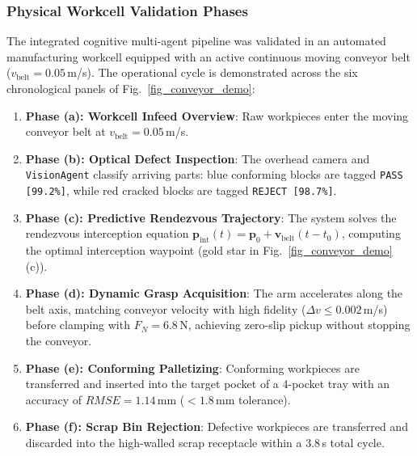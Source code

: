 \documentclass[journal]{IEEEtran}
\begin{document}
\subsubsection{Physical Workcell Validation Phases}
The integrated cognitive multi-agent pipeline was validated in an automated manufacturing workcell equipped with an active continuous moving conveyor belt ($v_{\text{belt}} = 0.05$\,m/s). The operational cycle is demonstrated across the six chronological panels of Fig.~\ref{fig_conveyor_demo}:
\begin{enumerate}
    \item \textbf{Phase (a): Workcell Infeed Overview}: Raw workpieces enter the moving conveyor belt at $v_{\text{belt}} = 0.05$\,m/s.
    \item \textbf{Phase (b): Optical Defect Inspection}: The overhead camera and \texttt{VisionAgent} classify arriving parts: blue conforming blocks are tagged \texttt{PASS [99.2\%]}, while red cracked blocks are tagged \texttt{REJECT [98.7\%]}.
    \item \textbf{Phase (c): Predictive Rendezvous Trajectory}: The system solves the rendezvous interception equation $\mathbf{p}_{\text{int}}(t) = \mathbf{p}_0 + \mathbf{v}_{\text{belt}}(t - t_0)$, computing the optimal interception waypoint (gold star in Fig.~\ref{fig_conveyor_demo}(c)).
    \item \textbf{Phase (d): Dynamic Grasp Acquisition}: The arm accelerates along the belt axis, matching conveyor velocity with high fidelity ($\Delta v \le 0.002$\,m/s) before clamping with $F_N = 6.8$\,N, achieving zero-slip pickup without stopping the conveyor.
    \item \textbf{Phase (e): Conforming Palletizing}: Conforming workpieces are transferred and inserted into the target pocket of a 4-pocket tray with an accuracy of $RMSE = 1.14$\,mm ($<1.8$\,mm tolerance).
    \item \textbf{Phase (f): Scrap Bin Rejection}: Defective workpieces are transferred and discarded into the high-walled scrap receptacle within a $3.8$\,s total cycle.
\end{enumerate}

\begin{table}[!t]
\centering
\caption{Industrial Moving Conveyor Sorting Validation Across 30 Continuous Cycles ($v_{\text{belt}} = 0.05$\,m/s)}
\label{table_conveyor_results}
\footnotesize
{}
\end{table}
\end{document}
